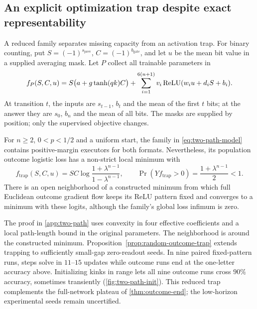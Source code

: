 \subsection{An explicit optimization trap despite exact representability}
\label{sec:two-path-trap}
A reduced family separates missing capacity from an activation trap. For binary
counting, put $S=(-1)^{s_{\mathrm{prev}}}$, $C=(-1)^{b_{\mathrm{gate}}}$,
and let $u$ be the mean bit value in a supplied averaging mask. Let $P$ collect all trainable parameters in
\begin{equation}
 f_P(S,C,u)=S\bigl(a+g\tanh(qk)C\bigr)
 +\sum_{i=1}^{6(n+1)}v_i\operatorname{ReLU}(w_i u+d_iS+b_i).
 \label{eq:two-path-model}
\end{equation}
At transition $t$, the inputs are $s_{t-1}$, $b_t$ and the mean of the first
$t$ bits; at the answer they are $s_0$, $b_n$ and the mean of all bits.
The masks are supplied by position; only the supervised objective changes.

\begin{proposition}
\label{prop:two-path-trap}
For $n\ge2$, $0<p<1/2$ and a uniform start, the family in
\cref{eq:two-path-model} contains positive-margin executors for both formats.
Nevertheless, its population outcome logistic loss has a non-strict local minimum
with
\[
 f_{\mathrm{trap}}(S,C,u)=S C\log\frac{1+\lambda^{n-1}}{1-\lambda^{n-1}},
 \qquad \Pr(Yf_{\mathrm{trap}}>0)=\frac{1+\lambda^{n-1}}2<1.
\]
There is an open neighborhood of a constructed minimum from which full
Euclidean outcome gradient flow keeps its ReLU pattern fixed and converges
to a minimum with these logits, although the family's global loss infimum is zero.
\end{proposition}
The proof in \cref{app:two-path} uses convexity in four effective coefficients
and a local path-length bound in the original parameters. The neighborhood is
around the constructed minimum. Proposition~\ref{prop:random-outcome-trap}
extends trapping to sufficiently small-gap zero-readout seeds. In nine paired fixed-pattern runs, steps solve in $11$--$15$ updates while
outcome runs end at the one-letter accuracy above. Initializing kinks in range
lets all nine outcome runs cross $90\%$ accuracy, sometimes transiently
(\cref{fig:two-path-init}). This reduced trap complements the full-network plateau
of \cref{thm:outcome-end}; the low-horizon experimental seeds remain uncertified.

